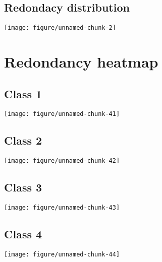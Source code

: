 \documentclass[a4paper]{article}\usepackage[]{graphicx}\usepackage[]{color}
\makeatletter
\def\maxwidth{ %
  \ifdim\Gin@nat@width>\linewidth
    \linewidth
  \else
    \Gin@nat@width
  \fi
}
\newenvironment{knitrout}{}{} %
\makeatother
\begin{document}
\subsection{Redondacy distribution}

\begin{knitrout}
\color{fgcolor}
\texttt{[image: figure/unnamed-chunk-2]} 

\end{knitrout}


\section{Redondancy heatmap}



\subsection{Class 1}
\texttt{[image: figure/unnamed-chunk-41]} 
\subsection{Class 2}
\texttt{[image: figure/unnamed-chunk-42]} 
\subsection{Class 3}
\texttt{[image: figure/unnamed-chunk-43]} 
\subsection{Class 4}
\texttt{[image: figure/unnamed-chunk-44]} 
\end{document}
